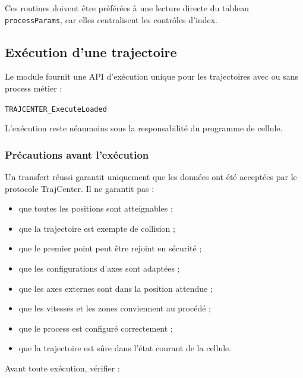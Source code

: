 \documentclass{rapportENSAM}
\begin{document}
Ces routines doivent être préférées à une lecture directe du tableau
\texttt{processParams}, car elles centralisent les contrôles d'index.


\subsection{Exécution d'une trajectoire}
\label{subsec:rapid-data-execution}

Le module fournit une API d'exécution unique pour les trajectoires avec ou sans
process métier :

\begin{center}
    \texttt{TRAJCENTER\_ExecuteLoaded}
\end{center}

L'exécution reste néanmoins sous la responsabilité du programme de cellule.


\subsubsection{Précautions avant l'exécution}
\label{subsubsec:rapid-safety-precautions}

Un transfert réussi garantit uniquement que les données ont été acceptées par
le protocole TrajCenter. Il ne garantit pas :

\begin{itemize}
    \item que toutes les positions sont atteignables ;
    \item que la trajectoire est exempte de collision ;
    \item que le premier point peut être rejoint en sécurité ;
    \item que les configurations d'axes sont adaptées ;
    \item que les axes externes sont dans la position attendue ;
    \item que les vitesses et les zones conviennent au procédé ;
    \item que le process est configuré correctement ;
    \item que la trajectoire est sûre dans l'état courant de la cellule.
\end{itemize}

Avant toute exécution, vérifier :
\end{document}
